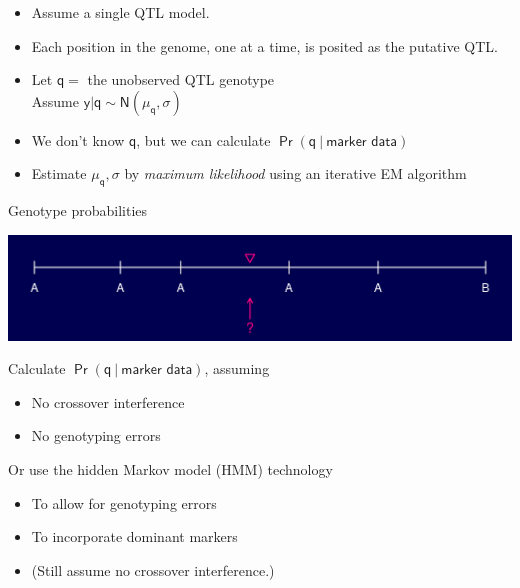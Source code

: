 \documentclass[12pt]{article}
\newcommand{\headsize}{\fontsize{35}{35} \selectfont}
\newcommand{\smallersize}{\fontsize{20}{25} \selectfont}
\begin{document}
\smallersize
\hfill \begin{minipage}{9.5in}
\begin{itemize}
\itemsep24pt
\setlength{\rightskip}{0pt plus 1fil} %
  \item Assume a {\color{mypink} single} QTL model.
  \item Each position in the genome, one at a time, is posited as the
  putative QTL.
  \item Let $\mathsf{q = }$ the unobserved QTL genotype \\
        Assume $\mathsf{y | q \sim N(\mu_q, \sigma)}$
  \item We don't know $\mathsf{q}$, but we can calculate
    $\mathsf{\Pr(q \ | \ \text{marker data})}$
  \item Estimate $\mathsf{\mu_q, \sigma}$ by \emph{maximum likelihood}
    using an iterative EM algorithm
\end{itemize}
\end{minipage}



\newpage

\headsize \color{myyellow}
\hfill \begin{minipage}{5.75in}
\centering
Genotype probabilities
\end{minipage}

\vspace{15mm}

\centerline{\includegraphics{Figs/genoprob1.pdf}}

\vspace{15mm}

\hfill
\begin{minipage}{10in}
\color{mywhite} \smallersize
Calculate {\color{myblue} $\mathsf{\Pr(q \ | \ \text{marker data})}$}, assuming
\begin{itemize}
\item No crossover interference
\item No genotyping errors
\end{itemize}

\vspace{10mm}

Or use the {\color{mypink} hidden Markov model (HMM)} technology
\begin{itemize}
\item To allow for genotyping errors
\item To incorporate dominant markers
\item {\color{myblue} (Still assume no crossover interference.)}
\end{itemize}
\end{minipage}
\end{document}

